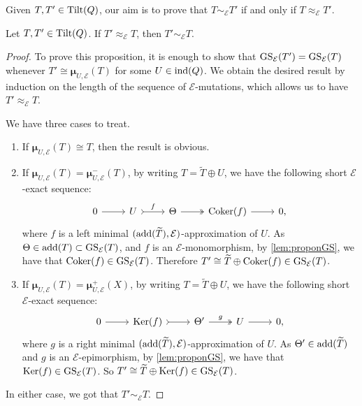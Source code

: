 Given $T,T' \in \operatorname{Tilt}(Q)$, our aim is to prove that $T \sim_{\mathcal{E}} T'$ if and only if $T \approx_{\mathcal{E}} T'$.

\begin{prop}
\label{prop:Tstable}
Let $T,T' \in \operatorname{Tilt}(Q)$. If $T' \approx_{\mathcal{E}} T$, then $T' \sim_{\mathcal{E}} T $.
\end{prop}


\begin{proof}
To prove this proposition, it is enough to show that $\operatorname{GS}_{\mathcal{E}}(T') = \operatorname{GS}_{\mathcal{E}}(T)$ whenever $T' \cong \pmb{\mu}_{U,\mathcal{E}}(T)$ for some $U \in \operatorname{ind}(Q)$. We obtain the desired result by induction on the length of the sequence of $\mathcal{E}$-mutations, which allows us to have $T'\approx_{\mathcal{E}} T$.

We have three cases to treat.
\begin{enumerate}[label=$\bullet$, itemsep=1mm]
    \item If $\pmb{\mu}_{U,\mathcal{E}}(T) \cong T$, then the result is obvious.
    \item If $\pmb{\mu}_{U,\mathcal{E}}(T) = \pmb{\mu}_{U,\mathcal{E}}^-(T)$, by writing $T = \widetilde{T} \oplus U$, we have the following short $\mathcal{E}$-exact sequence: 
\[\begin{tikzcd}
	0 & U & \Theta  & \Coker(f)&  0,
	\arrow[from=1-1, to=1-2]
	\arrow["f",tail, from=1-2, to=1-3]
	\arrow[two heads,from=1-3, to=1-4]
	\arrow[from=1-4, to=1-5]
\end{tikzcd} \] where $f$ is a left minimal $(\operatorname{add}(\widetilde{T}), \mathcal{E})$-approximation of $U$. As $\Theta \in \operatorname{add}(T) \subset \operatorname{GS}_\mathcal{E}(T)$, and $f$ is an $\mathcal{E}$-monomorphism, by \cref{lem:proponGS}, we have that $\operatorname{Coker}(f) \in  \operatorname{GS}_{\mathcal{E}}(T)$. Therefore $T' \cong \widetilde{T} \oplus \operatorname{Coker}(f) \in \operatorname{GS}_{\mathcal{E}}(T)$. 
    \item If $\pmb{\mu}_{U,\mathcal{E}}(T) = \pmb{\mu}_{U, \mathcal{E}}^{+}(X)$, by writing $T = \widetilde{T} \oplus U$, we have the following short $\mathcal{E}$-exact sequence: 
\[\begin{tikzcd}
	0 & \Ker(f) & \Theta' & U &  0,
	\arrow[from=1-1, to=1-2]
	\arrow[tail, from=1-2, to=1-3]
	\arrow["g",two heads,from=1-3, to=1-4]
	\arrow[from=1-4, to=1-5]
\end{tikzcd} \] where $g$ is a right minimal $(\operatorname{add}(\widetilde{T}), \mathcal{E})$-approximation of $U$. As $\Theta' \in \operatorname{add}(\widetilde{T})$ and $g$ is an $\mathcal{E}$-epimorphism, by \cref{lem:proponGS}, we have that $\operatorname{Ker}(f) \in \operatorname{GS}_{\mathcal{E}}(T)$. So $T' \cong \widetilde{T} \oplus \operatorname{Ker}(f) \in \operatorname{GS}_{\mathcal{E}}(T)$.
\end{enumerate}
In either case, we got that $T' \sim_{\mathcal{E}} T$.
\end{proof}

